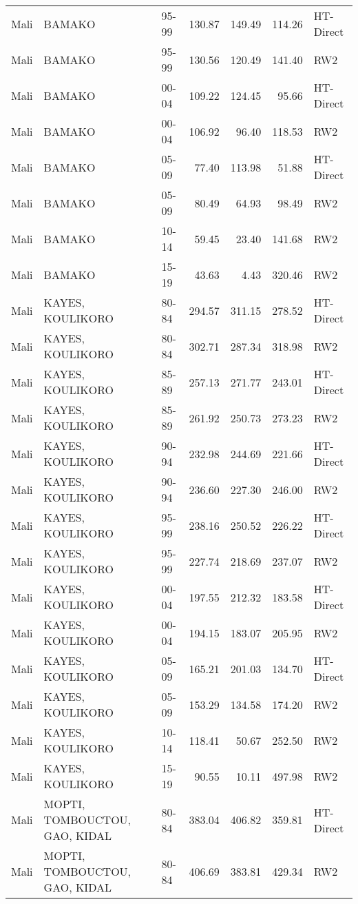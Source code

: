 \begin{longtable}{lllrrrl}
  Mali & BAMAKO & 95-99 & 130.87 & 149.49 & 114.26 & HT-Direct \\ 
  Mali & BAMAKO & 95-99 & 130.56 & 120.49 & 141.40 & RW2 \\ 
  Mali & BAMAKO & 00-04 & 109.22 & 124.45 & 95.66 & HT-Direct \\ 
  Mali & BAMAKO & 00-04 & 106.92 & 96.40 & 118.53 & RW2 \\ 
  Mali & BAMAKO & 05-09 & 77.40 & 113.98 & 51.88 & HT-Direct \\ 
  Mali & BAMAKO & 05-09 & 80.49 & 64.93 & 98.49 & RW2 \\ 
  Mali & BAMAKO & 10-14 & 59.45 & 23.40 & 141.68 & RW2 \\ 
  Mali & BAMAKO & 15-19 & 43.63 & 4.43 & 320.46 & RW2 \\ 
  Mali & KAYES, KOULIKORO & 80-84 & 294.57 & 311.15 & 278.52 & HT-Direct \\ 
  Mali & KAYES, KOULIKORO & 80-84 & 302.71 & 287.34 & 318.98 & RW2 \\ 
  Mali & KAYES, KOULIKORO & 85-89 & 257.13 & 271.77 & 243.01 & HT-Direct \\ 
  Mali & KAYES, KOULIKORO & 85-89 & 261.92 & 250.73 & 273.23 & RW2 \\ 
  Mali & KAYES, KOULIKORO & 90-94 & 232.98 & 244.69 & 221.66 & HT-Direct \\ 
  Mali & KAYES, KOULIKORO & 90-94 & 236.60 & 227.30 & 246.00 & RW2 \\ 
  Mali & KAYES, KOULIKORO & 95-99 & 238.16 & 250.52 & 226.22 & HT-Direct \\ 
  Mali & KAYES, KOULIKORO & 95-99 & 227.74 & 218.69 & 237.07 & RW2 \\ 
  Mali & KAYES, KOULIKORO & 00-04 & 197.55 & 212.32 & 183.58 & HT-Direct \\ 
  Mali & KAYES, KOULIKORO & 00-04 & 194.15 & 183.07 & 205.95 & RW2 \\ 
  Mali & KAYES, KOULIKORO & 05-09 & 165.21 & 201.03 & 134.70 & HT-Direct \\ 
  Mali & KAYES, KOULIKORO & 05-09 & 153.29 & 134.58 & 174.20 & RW2 \\ 
  Mali & KAYES, KOULIKORO & 10-14 & 118.41 & 50.67 & 252.50 & RW2 \\ 
  Mali & KAYES, KOULIKORO & 15-19 & 90.55 & 10.11 & 497.98 & RW2 \\ 
  Mali & MOPTI, TOMBOUCTOU, GAO, KIDAL & 80-84 & 383.04 & 406.82 & 359.81 & HT-Direct \\ 
  Mali & MOPTI, TOMBOUCTOU, GAO, KIDAL & 80-84 & 406.69 & 383.81 & 429.34 & RW2 \\ 

\end{longtable}
